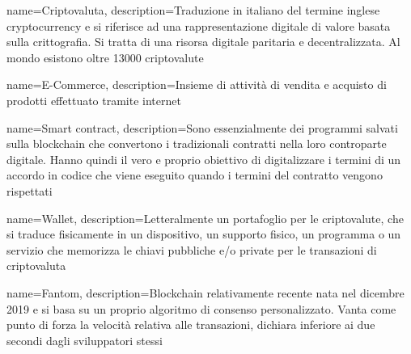 {
	name={Criptovaluta},
	description={Traduzione in italiano del termine inglese cryptocurrency e si riferisce ad una rappresentazione digitale di valore basata sulla crittografia. Si tratta di una risorsa digitale paritaria e decentralizzata. Al mondo esistono oltre 13000 criptovalute\glo}
}

{
	name={E-Commerce},
	description={Insieme di attività di vendita e acquisto di prodotti effettuato tramite internet}
}

{
	name={Smart contract},
	description={Sono essenzialmente dei programmi salvati sulla blockchain\glo{} che convertono i tradizionali contratti nella loro controparte digitale. Hanno quindi il vero e proprio obiettivo di digitalizzare i termini di un accordo in codice che viene eseguito quando i termini del contratto vengono rispettati}
}

{
	name={Wallet},
	description={Letteralmente un portafoglio per le criptovalute\glo{}, che si traduce fisicamente in un dispositivo, un supporto fisico, un programma o un servizio che memorizza le chiavi pubbliche e/o private per le transazioni di criptovaluta\glo}
}

{
	name={Fantom},
	description={Blockchain\glo{} relativamente recente nata nel dicembre 2019 e si basa su un proprio algoritmo di consenso personalizzato. Vanta come punto di forza la velocità relativa alle transazioni, dichiara inferiore ai due secondi dagli sviluppatori stessi}
}